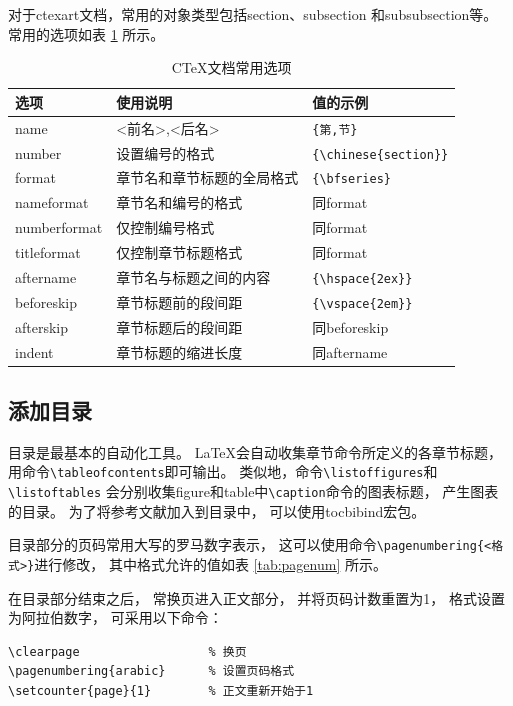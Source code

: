 \documentclass{ctexart}
\numberwithin{equation}{section}			%
\begin{document}
	对于ctexart文档，常用的对象类型包括section、subsection
	和subsubsection等。
	常用的选项如表 \ref{tab:ctexopt} 所示。
	
	\begin{table}
		\centering
		\caption{C\TeX 文档常用选项}
		\label{tab:ctexopt}
		\begin{tabular}{lll}
			\toprule
			选项 & 使用说明 & 值的示例 \\
			\midrule
			name & {<前名>,<后名>} & \verb|{第,节}| \\
			number & 设置编号的格式 & \verb|{\chinese{section}}| \\
			format & 章节名和章节标题的全局格式 & \verb|{\bfseries}| \\
			nameformat & 章节名和编号的格式 & 同format \\
			numberformat & 仅控制编号格式 & 同format \\
			titleformat & 仅控制章节标题格式 & 同format\\
			aftername & 章节名与标题之间的内容 & \verb|{\hspace{2ex}}| \\
			beforeskip & 章节标题前的段间距 & \verb|{\vspace{2em}}| \\
			afterskip & 章节标题后的段间距 & 同beforeskip \\
			indent & 章节标题的缩进长度 & 同aftername \\
			\bottomrule
		\end{tabular}
	\end{table}
	
	\subsection{添加目录}
	目录是最基本的自动化工具。
	\LaTeX 会自动收集章节命令所定义的各章节标题，
	用命令\verb|\tableofcontents|即可输出。
	类似地，命令\verb|\listoffigures|和\verb|\listoftables|
	会分别收集figure和table中\verb|\caption|命令的图表标题，
	产生图表的目录。
	为了将参考文献加入到目录中，
	可以使用tocbibind宏包。
	
	目录部分的页码常用大写的罗马数字表示，
	这可以使用命令\verb|\pagenumbering{<格式>}|进行修改，
	其中格式允许的值如表 \ref{tab:pagenum} 所示。
	
	在目录部分结束之后，
	常换页进入正文部分，
	并将页码计数重置为1，
	格式设置为阿拉伯数字，
	可采用以下命令：
	
\begin{lstlisting}
\clearpage					% 换页
\pagenumbering{arabic}		% 设置页码格式
\setcounter{page}{1}		% 正文重新开始于1
\end{lstlisting}
	
\end{document}
